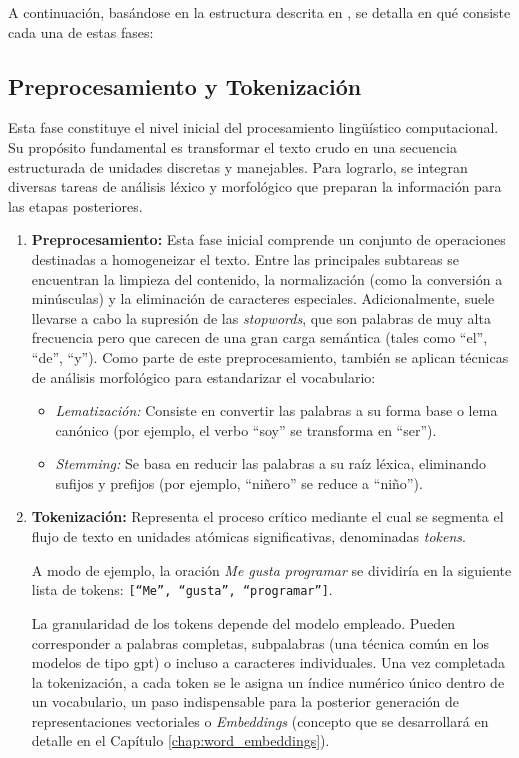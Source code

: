 A continuación, basándose en la estructura descrita en \cite{geeksforgeeks_phases_nlp_2025}, se detalla en qué consiste cada una de estas fases:

\subsection{Preprocesamiento y Tokenización}

Esta fase constituye el nivel inicial del procesamiento lingüístico computacional. Su propósito fundamental es transformar el texto crudo en una secuencia estructurada de unidades discretas y manejables. Para lograrlo, se integran diversas tareas de análisis léxico y morfológico que preparan la información para las etapas posteriores.

\begin{enumerate}
      \item \textbf{Preprocesamiento:} Esta fase inicial comprende un conjunto de operaciones destinadas a homogeneizar el texto. Entre las principales subtareas se encuentran la limpieza del contenido, la normalización (como la conversión a minúsculas) y la eliminación de caracteres especiales. Adicionalmente, suele llevarse a cabo la supresión de las \textit{stopwords}, que son palabras de muy alta frecuencia pero que carecen de una gran carga semántica (tales como ``el'', ``de'', ``y''). Como parte de este preprocesamiento, también se aplican técnicas de análisis morfológico para estandarizar el vocabulario:
            \begin{itemize}
                  \item \textit{Lematización:} Consiste en convertir las palabras a su forma base o lema canónico (por ejemplo, el verbo ``soy'' se transforma en ``ser'').
                  \item \textit{Stemming:} Se basa en reducir las palabras a su raíz léxica, eliminando sufijos y prefijos (por ejemplo, ``niñero'' se reduce a ``niño'').
            \end{itemize}

      \item \textbf{Tokenización:} Representa el proceso crítico mediante el cual se segmenta el flujo de texto en unidades atómicas significativas, denominadas \textit{tokens}.

            A modo de ejemplo, la oración \textit{Me gusta programar} se dividiría en la siguiente lista de tokens: \texttt{[``Me'', ``gusta'', ``programar'']}.

            La granularidad de los tokens depende del modelo empleado. Pueden corresponder a palabras completas, subpalabras (una técnica común en los modelos de tipo \gls{gpt}) o incluso a caracteres individuales. Una vez completada la tokenización, a cada token se le asigna un índice numérico único dentro de un vocabulario, un paso indispensable para la posterior generación de representaciones vectoriales o \textit{Embeddings} (concepto que se desarrollará en detalle en el Capítulo \ref{chap:word_embeddings}).


\end{enumerate}

